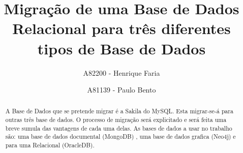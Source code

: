 

\title{Migração de uma Base de Dados Relacional para três diferentes tipos de Base de Dados}

\author{A82200 - Henrique Faria \and A81139 - Paulo Bento}




\maketitle

\begin{abstract}

A Base de Dados que se pretende migrar é a Sakila do MySQL. Esta migrar-se-á para outras três base de dados. O processo de migração será explicitado e será feita uma breve sumula das vantagens de cada uma delas. As bases de dados a usar no trabalho são: uma base de dados documental (MongoDB) , uma base de dados grafica (Neo4j) e para uma Relacional (OracleDB).

\end{abstract}
\newpage

